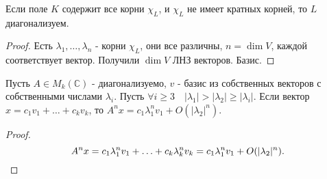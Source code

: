 \begin{consequence} \thmslashn

    Если поле $K$ содержит все корни $\chi_{L}$, и $\chi_{L}$ не имеет кратных корней, то $L$ диагонализуем.
    \begin{proof} \thmslashn
    
        Есть $\lambda_1, \ldots, \lambda_{n}$ - корни $\chi_{L}$, они все различны, $n = \dim V$, каждой соответствует вектор. Получили $\dim V$ ЛНЗ векторов. Базис.
    \end{proof}
\end{consequence}
\begin{lemma} \thmslashn

    Пусть $A\in M_{k}(\mathbb{C})$ - диагонализуемо, $v$ - базис из собственных векторов с собственными числами $\lambda_{i}$. Пусть $\forall{i \ge 3}\quad |\lambda_1| > |\lambda_2| \ge |\lambda_{i}|$. Если вектор $x = c_1v_1 + \ldots + c_{k}v_{k}$, то $A^{n}x = c_1\lambda_1^{n}v_1 + O(|\lambda_2|^{n})$.
    \begin{proof} \thmslashn
    
        \[ A^{n}x = c_1\lambda_1^{n}v_1 + \ldots + c_{k}\lambda_{k}^{n}v_{k} = c_1\lambda_1^{n}v_1 + O(|\lambda_2|^{n}) .\qedhere\]  
    \end{proof}
\end{lemma}
